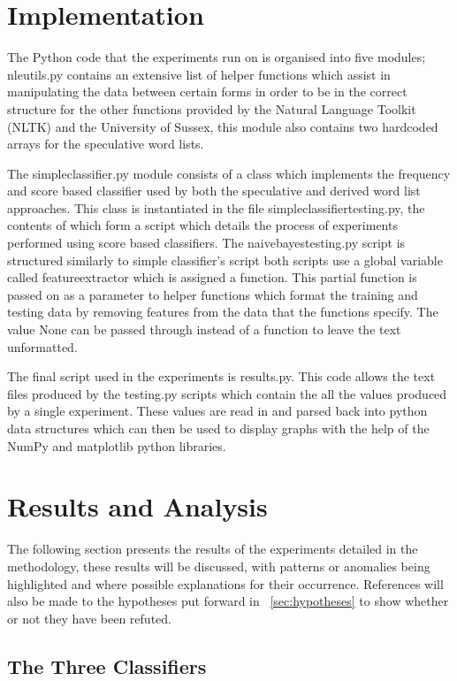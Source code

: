 \documentclass{llncs}
\begin{document}
\section{Implementation}
The Python code that the experiments run on is organised into five modules; nle\textunderscore utils.py contains an extensive list of helper functions which assist in manipulating the data between certain forms in order to be in the correct structure for the other functions provided by the Natural Language Toolkit (NLTK) and the University of Sussex, this module also contains two hardcoded arrays for the speculative word lists.

The simple\textunderscore classifier.py module consists of a class which implements the frequency and score based classifier used by both the speculative and derived word list approaches. This class is instantiated in the file simple\textunderscore classifier\textunderscore testing.py, the contents of which form a script which details the process of experiments performed using score based classifiers. The naive\textunderscore bayes\textunderscore testing.py script is structured similarly to simple classifier's script both scripts use a global variable called feature\textunderscore extractor which is assigned a function. This partial function is passed on as a parameter to helper functions which format the training and testing data by removing features from the data that the functions specify. The value None can be passed through instead of a function to leave the text unformatted.

The final script used in the experiments is results.py. This code allows the text files produced by the \textunderscore testing.py scripts which contain the all the values produced by a single experiment. These values are read in and parsed back into python data structures which can then be used to display graphs with the help of the NumPy and matplotlib python libraries.

\section{Results and Analysis}
The following section presents the results of the experiments detailed in the methodology, these results will be discussed, with patterns or anomalies being highlighted and where possible explanations for their occurrence. References will also be made to the hypotheses put forward in ~\ref{sec:hypotheses} to show whether or not they have been refuted.

\subsection{The Three Classifiers}
\end{document}
